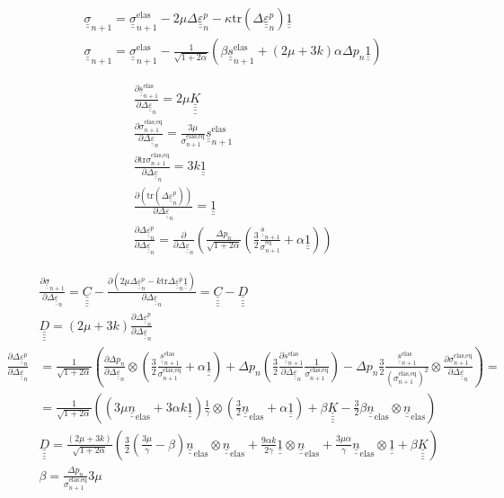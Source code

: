 \documentclass[12pt]{article}
\newcommand\ul[1]{\underline{#1}}
\newcommand\uusigma{\ul{\ul{\sigma}}}
\newcommand\uus{\ul{\ul{s}}}
\newcommand\uuUnit{\ul{\ul{1}}}
\newcommand\uueps{\ul{\ul{\varepsilon}}}
\newcommand{\uuuuK}{\ul{\ul{\ul{\ul{K}}}}}
\newcommand{\uuuuC}{\ul{\ul{\ul{\ul{C}}}}}
\newcommand{\uuuuD}{\ul{\ul{\ul{\ul{D}}}}}
\newcommand\Deltaepsp{\Delta \uueps_{n}^p}
\newcommand\Deltaeps{\Delta \uueps_{n}}
\newcommand\sigmaeqn{\sigma_{n+1}^\text{eq}}
\newcommand\sigmaeqnelas{\sigma_{n+1}^\text{elas,eq}}
\newcommand\uusn{\uus_{n+1}}
\newcommand\uusnelas{\uus_{n+1}^\text{elas}}
\newcommand\uusigman{\ul{\ul{\sigma}}_{n+1}}
\newcommand{\uunelas}{\ul{\ul{n}}_\text{elas}}
\newcommand\mtr{\mathrm{tr}}
\begin{document}
\begin{align}
    & \uusigma_{n+1} = \uusigma_{n+1}^\text{elas} - 2\mu \Deltaepsp - \kappa \mtr (\Deltaepsp) \uuUnit \\
    & \uusigma_{n+1} = \uusigma_{n+1}^\text{elas} - \frac{1}{\sqrt{1 + 2\alpha}}\left( \beta \uusnelas + (2\mu + 3k)\alpha \Delta p_n \uuUnit \right) 
\end{align}

\begin{align}
    & \frac{\partial \uusnelas{}}{\partial \Deltaeps} = 2\mu \uuuuK\\
    & \frac{\partial \sigmaeqnelas{}}{\partial \Deltaeps} = \frac{3\mu}{\sigmaeqnelas}\uusnelas \\
    & \frac{\partial\mtr\sigmaeqnelas}{\partial\Deltaeps} = 3k\uuUnit \\
    & \frac{\partial (\mtr (\Deltaepsp) )}{\partial \Deltaeps} = \uuUnit \\
    & \frac{\partial \Deltaepsp}{\partial \Deltaeps} = \frac{\partial}{\partial \Deltaeps} \left( \frac{\Delta p_n}{\sqrt{1 + 2\alpha}} \left( \frac{3}{2} \frac{\uusn}{\sigmaeqn} + \alpha \uuUnit \right)  \right)
\end{align}

\begin{align}
    & \frac{\partial\uusigman}{\partial \Deltaeps} = \uuuuC - \frac{\partial (2\mu\Deltaepsp - k\mtr\Deltaepsp\uuUnit)}{\partial\Deltaeps} = \uuuuC - \uuuuD \\
    & \uuuuD = (2\mu + 3k)\frac{\partial\Deltaepsp}{\partial\Deltaeps} \\
    \frac{\partial \Deltaepsp}{\partial \Deltaeps} &= \frac{1}{\sqrt{1 + 2\alpha}}\left( \frac{\partial\Delta p_n}{\partial\Deltaeps} \otimes \left( \frac{3}{2}\frac{\uusnelas}{\sigmaeqnelas} + \alpha \uuUnit \right) + \Delta p_n \left(\frac{3}{2} \frac{\partial\uusnelas}{\partial\Deltaeps}\frac{1}{\sigmaeqnelas} \right) - \Delta p_n \frac{3}{2} \frac{\uusnelas}{(\sigmaeqnelas)^2} \otimes \frac{\partial\sigmaeqnelas}{\partial\Deltaeps}\right) = \\
    & = \frac{1}{\sqrt{1 + 2\alpha}}\left( \left( 3\mu \uunelas + 3\alpha k \uuUnit \right) \frac{1}{\gamma} \otimes \left( \frac{3}{2} \uunelas + \alpha\uuUnit \right) + \beta\uuuuK - \frac{3}{2}\beta\uunelas \otimes \uunelas \right) \\
    & \uuuuD = \frac{(2\mu + 3k)}{\sqrt{1 + 2\alpha}}\left( \frac{3}{2} \left(\frac{3\mu}{\gamma} - \beta\right)\uunelas \otimes \uunelas + \frac{9\alpha k}{2\gamma} \uuUnit \otimes \uunelas + \frac{3\mu\alpha}{\gamma} \uunelas \otimes \uuUnit + \beta \uuuuK \right) \\
    & \beta = \frac{\Delta p_n}{\sigmaeqnelas} 3\mu
\end{align}
\end{document}
